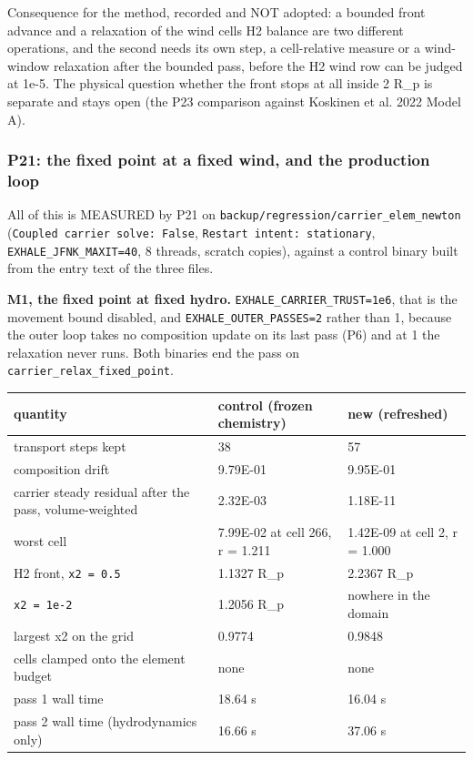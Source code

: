 \documentclass[english,a4paper]{my_memo}
\begin{document}
Consequence for the method, recorded and NOT adopted: a bounded front advance
and a relaxation of the wind cells\textquotesingle{} H2 balance are two different operations,
and the second needs its own step, a cell-relative measure or a wind-window
relaxation after the bounded pass, before the H2 wind row can be judged at
1e-5. The physical question whether the front stops at all inside 2 R\_p is
separate and stays open (the P23 comparison against Koskinen et al. 2022
Model A).

\subsubsection{P21: the fixed point at a fixed wind, and the production loop}\label{p21-the-fixed-point-at-a-fixed-wind-and-the-production-loop}

All of this is MEASURED by P21 on \texttt{backup/regression/carrier\_elem\_newton}
(\texttt{Coupled\ carrier\ solve:\ False}, \texttt{Restart\ intent:\ stationary},
\texttt{EXHALE\_JFNK\_MAXIT=40}, 8 threads, scratch copies), against a control binary
built from the entry text of the three files.

\textbf{M1, the fixed point at fixed hydro.} \texttt{EXHALE\_CARRIER\_TRUST=1e6}, that is the
movement bound disabled, and \texttt{EXHALE\_OUTER\_PASSES=2} rather than 1, because the
outer loop takes no composition update on its last pass (P6) and at 1 the
relaxation never runs. Both binaries end the pass on
\texttt{carrier\_relax\_fixed\_point}.

{\def\LTcaptype{none} %
{\small
\begin{longtable}[]{@{}lll@{}}
\toprule\noalign{}
quantity & control (frozen chemistry) & new (refreshed) \\
\midrule\noalign{}
\endhead
\bottomrule\noalign{}
\endlastfoot
transport steps kept & 38 & 57 \\
composition drift & 9.79E-01 & 9.95E-01 \\
carrier steady residual after the pass, volume-weighted & 2.32E-03 & 1.18E-11 \\
worst cell & 7.99E-02 at cell 266, r = 1.211 & 1.42E-09 at cell 2, r = 1.000 \\
H2 front, \texttt{x2\ =\ 0.5} & 1.1327 R\_p & 2.2367 R\_p \\
\texttt{x2\ =\ 1e-2} & 1.2056 R\_p & nowhere in the domain \\
largest x2 on the grid & 0.9774 & 0.9848 \\
cells clamped onto the element budget & none & none \\
pass 1 wall time & 18.64 s & 16.04 s \\
pass 2 wall time (hydrodynamics only) & 16.66 s & 37.06 s \\
\end{longtable}
}
}
\end{document}
